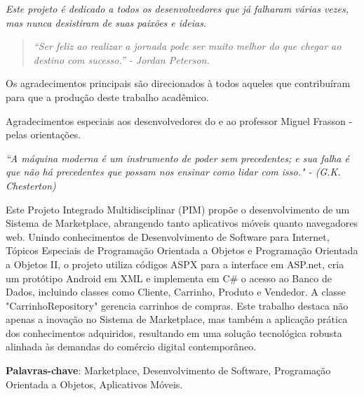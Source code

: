 \documentclass[
	12pt,				%
	openright,			%
	twoside,			%
	a4paper,			%
	english,			%
	brazil				%
	]{abntex2}
\begin{document}
\begin{dedicatoria}
	\vspace*{\fill}
	\centering
	\noindent
	\textit{Este projeto é dedicado a todos os desenvolvedores que já falharam várias vezes, mas nunca desistiram de suas paixões e ideias.}

	\begin{quote}
	\textit{``Ser feliz ao realizar a jornada pode ser muito melhor do que chegar ao destino com sucesso.'' - Jordan Peterson.}
	\end{quote}

	\vspace*{\fill}

\end{dedicatoria}

\begin{agradecimentos}
	Os agradecimentos principais são direcionados à todos aqueles que contribuíram para que a produção deste trabalho acadêmico.

	Agradecimentos especiais aos desenvolvedores do \abnTeX e ao professor Miguel Frasson - pelas orientações.

\end{agradecimentos}


\begin{epigrafe}
	\vspace*{\fill}
	\begin{flushright}
		\textit{``A máquina moderna é um instrumento de poder sem precedentes; e sua falha é que não há precedentes que possam nos ensinar como lidar com isso." - (G.K. Chesterton)}
	\end{flushright}
\end{epigrafe}


\setlength{\absparsep}{18pt} %
\begin{resumo}
    Este Projeto Integrado Multidisciplinar (PIM) propõe o desenvolvimento de um Sistema de Marketplace, abrangendo tanto aplicativos móveis quanto navegadores web. Unindo conhecimentos de Desenvolvimento de Software para Internet, Tópicos Especiais de Programação Orientada a Objetos e Programação Orientada a Objetos II, o projeto utiliza códigos ASPX para a interface em ASP.net, cria um protótipo Android em XML e implementa em C# o acesso ao Banco de Dados, incluindo classes como Cliente, Carrinho, Produto e Vendedor. A classe "CarrinhoRepository" gerencia carrinhos de compras. Este trabalho destaca não apenas a inovação no Sistema de Marketplace, mas também a aplicação prática dos conhecimentos adquiridos, resultando em uma solução tecnológica robusta alinhada às demandas do comércio digital contemporâneo.

 \textbf{Palavras-chave}: Marketplace, Desenvolvimento de Software, Programação Orientada a Objetos, Aplicativos Móveis.
\end{resumo}
\end{document}
